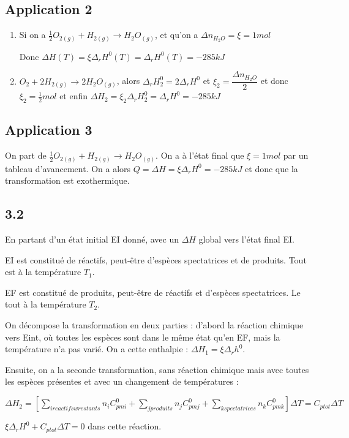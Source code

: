 \documentclass[a4paper,12pt]{book}
\begin{document}
\subsection{Application 2}
\begin{enumerate}
\item Si on a $\frac{1}{2}O_{2(g)} + H_{2(g)}\rightarrow H_2O_{(g)}$, et qu'on a $\Delta n_{H_2O}=\xi=1 mol$ \par Donc $\Delta H(T) = \xi\Delta_rH^0(T)=\Delta_rH^0(T)=-285kJ$
\item $O_2+ 2H_{2(g)}\rightarrow 2H_2O_{(g)}$, alors $\Delta_rH^0_2=2\Delta_rH^0$ et $\xi_2=\dfrac{\Delta n_{H_2O}}{2}$ et donc $\xi_2 =\frac{1}{2}mol$ et enfin $\Delta H_2=\xi_2\Delta_rH^0_2=\Delta_rH^0=-285kJ$
\end{enumerate}

\subsection{Application 3}
On part de $\frac{1}{2}O_{2(g)} + H_{2(g)}\rightarrow H_2O_{(g)}$. On a à l'état final que $\xi= 1mol$ par un tableau d'avancement. On a alors $Q=\Delta H =\xi\Delta_rH^0=-285kJ$ et donc que la transformation est exothermique.

\subsection{3.2}
En partant d'un état initial EI donné, avec un $\Delta H$ global vers l'état final EI.\par EI est constitué de réactifs, peut-être d'espèces spectatrices et de produits. Tout est à la température $T_1$.\par EF est constitué de produits, peut-être de réactifs et d'espèces spectatrices. Le tout à la température $T_2$.
\par On décompose la transformation en deux parties : d'abord la réaction chimique vers Eint, où toutes les espèces sont dans le même état qu'en EF, mais la température n'a pas varié. On a cette enthalpie : $\Delta H_1=\xi\Delta_rh^0$.
\par Ensuite, on a la seconde transformation, sans réaction chimique mais avec toutes les espèces présentes et avec un changement de températures :
\par $\Delta H_2 = \left[\sum\limits_{i reactifsw restants}n_iC_{pmi}^0 +\sum\limits_{jproduits} n_jC_{pmj}^0 + \sum\limits_{k spectatrices} n_kC_{pmk}^0\right]\Delta T = C_{ptot}\Delta T$
\par $\xi\Delta_rH^0 + C_{ptot}\Delta T=0$ dans cette réaction.
\end{document}
